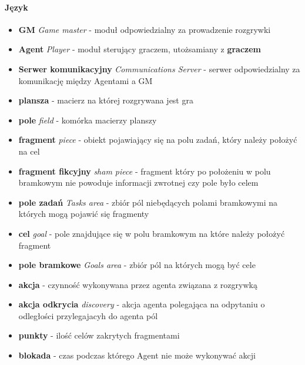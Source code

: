 \documentclass[Dokumentacja.tex]{subfiles}
\begin{document}
\paragraph{Język}
\begin{itemize}
    \item \textbf{GM} \textit{Game master} - moduł odpowiedzialny za prowadzenie rozgrywki
    \item \textbf{Agent} \textit{Player} - moduł sterujący graczem, utożsamiany z \textbf{graczem}
    \item \textbf{Serwer komunikacyjny} \textit{Communications Server} - serwer odpowiedzialny za komunikację między Agentami a GM
    \item \textbf{plansza} - macierz na której rozgrywana jest gra
    \item \textbf{pole} \textit{field} - komórka macierzy planszy
    \item \textbf{fragment} \textit{piece} - obiekt pojawiający się na polu zadań, który należy położyć na cel
    \item \textbf{fragment fikcyjny} \textit{sham piece} - fragment który po położeniu w polu bramkowym nie powoduje informacji zwrotnej czy pole było celem
    \item \textbf{pole zadań} \textit{Tasks area} - zbiór pól niebędących polami bramkowymi na których mogą pojawić się fragmenty
    \item \textbf{cel} \textit{goal} - pole znajdujące się w polu bramkowym na które należy położyć fragment
    \item \textbf{pole bramkowe} \textit{Goals area} - zbiór pól na których mogą być cele
    \item \textbf{akcja} - czynność wykonywana przez agenta związana z rozgrywką
    \item \textbf{akcja odkrycia} \textit{discovery} - akcja agenta polegająca na odpytaniu o odległości przylegajacyh do agenta pól
    \item \textbf{punkty} - ilość celów zakrytych fragmentami
    \item \textbf{blokada} - czas podczas którego Agent nie może wykonywać akcji
\end{itemize}
\end{document}
